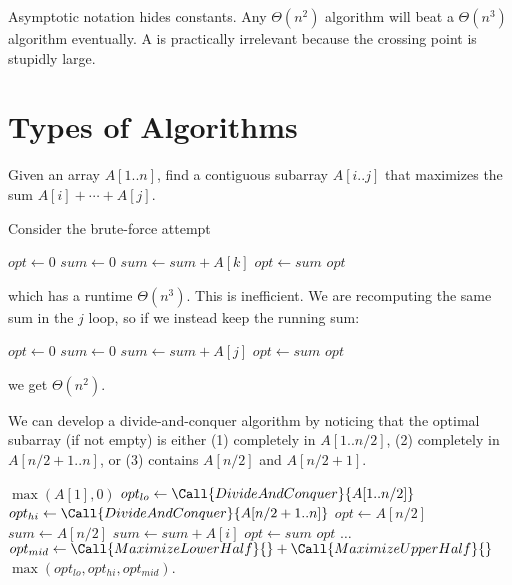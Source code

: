Asymptotic notation hides constants.
Any $\Theta(n^2)$ algorithm will beat a $\Theta(n^3)$ algorithm eventually.
A  is practically irrelevant because the crossing point is stupidly large.

\section{Types of Algorithms}

\begin{problem}
Given an array $A[1..n]$, find a contiguous subarray $A[i..j]$ that maximizes the sum $A[i] + \dotsb + A[j]$.
\end{problem}

Consider the brute-force attempt
\begin{algorithm}[H]
  \caption{}
  \begin{algorithmic}[1]
    \State $opt \gets 0$
    \State $sum \gets 0$
    \State $sum \gets sum + A[k]$
    \EndFor
     \State $opt \gets sum$ \EndIf
    \EndFor
    \EndFor
    \State \Return $opt$
  \end{algorithmic}
\end{algorithm}
which has a runtime $\Theta(n^3)$.
This is inefficient.
We are recomputing the same sum in the $j$ loop,
so if we instead keep the running sum:
\begin{algorithm}[H]
  \caption{}
  \begin{algorithmic}[1]
    \State $opt \gets 0$
    \State $sum \gets 0$
    \State $sum \gets sum + A[j]$
     \State $opt \gets sum$ \EndIf
    \EndFor
    \EndFor
    \State \Return $opt$
  \end{algorithmic}
\end{algorithm}
we get $\Theta(n^2)$.

We can develop a divide-and-conquer algorithm by noticing that
the optimal subarray (if not empty) is either
(1) completely in $A[1..n/2]$,
(2) completely in $A[n/2+1..n]$,
or (3) contains $A[n/2]$ and $A[n/2+1]$.

\begin{algorithm}
  \caption{}
  \begin{algorithmic}[1]
     \Return $\max(A[1],0)$ \EndIf
    \State $opt_{lo} \gets \Call{DivideAndConquer}{A[1..n/2]}$
    \State $opt_{hi} \gets \Call{DivideAndConquer}{A[n/2+1..n]}$
    \State $opt \gets A[n/2]$
    \State $sum \gets A[n/2]$
    \State $sum \gets sum + A[i]$
     $opt \gets sum$ \EndIf
    \EndFor
    \State \Return $opt$
    \EndFunction
    \State $\dots$
    \EndFunction
    \State $opt_{mid} \gets \Call{MaximizeLowerHalf}{\null} + \Call{MaximizeUpperHalf}{\null}$
    \State \Return $\max(opt_{lo},opt_{hi},opt_{mid})$.
  \end{algorithmic}
\end{algorithm}

